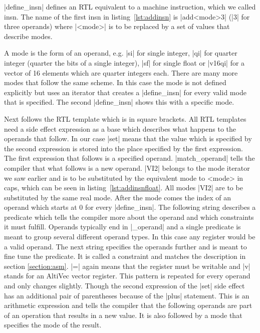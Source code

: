 {|define_insn| defines an \ac{RTL} equivalent to a machine instruction, which we called insn.
The name of the first insn in listing~\ref{lst:addinsn} is |add<mode>3| (|3| for three operands) where |<mode>| is to be replaced by a set of values that describe modes. \cite{GCCint:stdnames}

A mode is the form of an operand, e.g. |si| for single integer, |qi| for quarter integer (quarter the bits of a single integer), |sf| for single float or |v16qi| for a vector of 16 elements which are quarter integers each. \cite{GCCint:modes}
There are many more modes that follow the same scheme.
In this case the mode is not defined explicitly but uses an iterator that creates a |define_insn| for every valid mode that is specified. \cite{GCCint:iterator}
The second |define_insn| shows this with a specific mode.

Next follows the \ac{RTL} template which is in square brackets.
All \ac{RTL} templates need a side effect expression as a base which describes what happens to the operands that follow.
In our case |set| means that the value which is specified by the second expression is stored into the place specified by the first expression. \cite{GCCint:sideeffect}
The first expression that follows is a specified operand.
|match_operand| tells the compiler that what follows is a new operand.
|VI2| belongs to the mode iterator we saw earlier and is to be substituted by the equivalent mode to <mode> in caps, which can be seen  in listing~\ref{lst:addinsnfloat}.
All modes |VI2| are to be substituted by the same real mode.
After the mode comes the index of an operand which starts at 0 for every |define_insn|.
The following string describes a predicate which tells the compiler more about the operand and which constraints it must fulfill.
Operands typically end in |_operand| and a single predicate is meant to group several different operand types.
In this case any register would be a valid operand. \cite{GCCint:predicates}
The next string specifies the operands further and is meant to fine tune the predicate.
It is called a constraint and matches the description in section \ref{section:asm}.
|=| again means that the register must be writable and |v| stands for an AltiVec vector register.\cite{GCCint:constraints}
This pattern is repeated for every operand and only changes slightly.
Though the second expression of the |set| side effect has an additional pair of parentheses because of the |plus| statement.
This is an arithmetic expression and tells the compiler that the following operands are part of an operation that results in a new value.
It is also followed by a mode that specifies the mode of the result.\cite{GCCint:arith}

}
